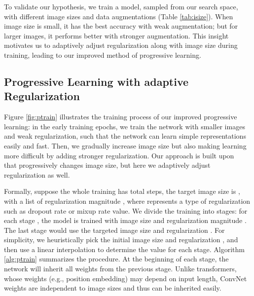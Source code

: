 \documentclass{article}
\begin{document}
To validate our hypothesis, we train a model, sampled from our search space, with different image sizes and data augmentations (Table \ref{tab:isize}). When image size is small, it has the best accuracy with weak augmentation; but for larger images, it performs better with stronger augmentation. This insight motivates us to adaptively adjust regularization along with image size during training, leading to our improved method of progressive learning.

\begin{table}[!h]
    \vskip -0.15in
    \caption{ImageNet top-1 accuracy. We use RandAug~\cite{randaug20}, and report mean and stdev for 3 runs.}
    \centering
    \label{tab:isize}
    \vskip -0.1in
\end{table} 

\subsection{\normalsize Progressive Learning with adaptive Regularization}

Figure \ref{fig:ptrain} illustrates the training process of our improved progressive learning: in the early training epochs, we train the network with smaller images and weak regularization, such that the network can learn simple representations easily and fast. Then, we gradually increase image size but also making learning more difficult by adding stronger regularization.  Our approach is built upon ~\cite{fastaidawnbench} that progressively changes image size, but here we adaptively adjust regularization as well.

Formally, suppose the whole training has  total steps, the target image size is , with a list of regularization magnitude , where  represents a type of regularization such as dropout rate or mixup rate value. We divide the training into  stages: for each stage , the model is trained with image size  and regularization magnitude . The last stage  would use the targeted image size  and regularization . For simplicity, we heuristically pick the initial image size  and regularization , and then use a linear interpolation to determine the value for each stage. Algorithm \ref{alg:ptrain} summarizes the procedure. At the beginning of each stage, the network will inherit all weights from the previous stage. Unlike transformers, whose weights (e.g., position embedding) may depend on input length, ConvNet weights are independent to image sizes and thus can be inherited easily.
\end{document}

